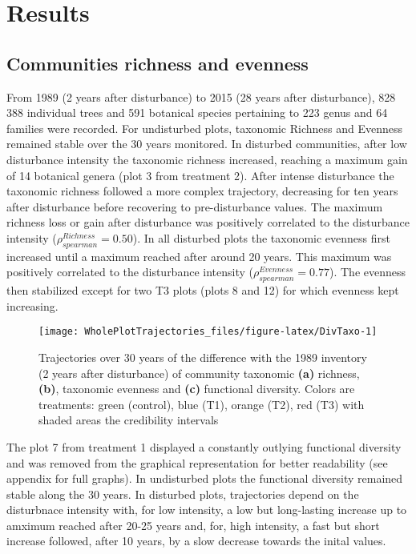 \documentclass[fleqn,10pt]{ArtEcoFoG} %
\begin{document}
\section{Results}\label{results}

\subsection{Communities richness and
evenness}\label{communities-richness-and-evenness}

From 1989 (2 years after disturbance) to 2015 (28 years after
disturbance), 828 388 individual trees and 591 botanical species
pertaining to 223 genus and 64 families were recorded. For undisturbed
plots, taxonomic Richness and Evenness remained stable over the 30 years
monitored. In disturbed communities, after low disturbance intensity the
taxonomic richness increased, reaching a maximum gain of 14 botanical
genera (plot 3 from treatment 2). After intense disturbance the
taxonomic richness followed a more complex trajectory, decreasing for
ten years after disturbance before recovering to pre-disturbance values.
The maximum richness loss or gain after disturbance was positively
correlated to the disturbance intensity
(\(\rho_{spearman}^{Richness}=0.50\)). In all disturbed plots the
taxonomic evenness first increased until a maximum reached after around
20 years. This maximum was positively correlated to the disturbance
intensity (\(\rho_{spearman}^{Evenness}=0.77\)). The evenness then
stabilized except for two T3 plots (plots 8 and 12) for which evenness
kept increasing.

\begin{figure*}

{\centering \texttt{[image: WholePlotTrajectories\_files/figure-latex/DivTaxo-1]} 

}

\caption{Trajectories over 30 years of the difference with the 1989 inventory (2 years after disturbance) of community taxonomic \textbf{(a)} richness, \textbf{(b)}, taxonomic evenness and \textbf{(c)} functional diversity. Colors are treatments: green (control), blue (T1), orange (T2), red (T3) with shaded areas the credibility intervals }\label{fig:DivTaxo}
\end{figure*}

The plot 7 from treatment 1 displayed a constantly outlying functional
diversity and was removed from the graphical representation for better
readability (see appendix for full graphs). In undisturbed plots the
functional diversity remained stable along the 30 years. In disturbed
plots, trajectories depend on the disturbnace intensity with, for low
intensity, a low but long-lasting increase up to amximum reached after
20-25 years and, for, high intensity, a fast but short increase
followed, after 10 years, by a slow decrease towards the inital values.
\end{document}
